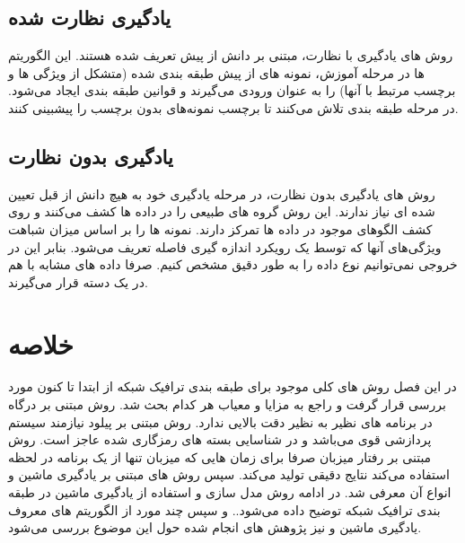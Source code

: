 \subsection{یادگیری نظارت شده}
روش های یادگیری با نظارت، مبتنی بر دانش از پیش تعریف شده هستند. این الگوریتم ها در مرحله آموزش، نمونه های از پیش طبقه بندی شده (متشکل از ویژگی ها و
برچسب مرتبط با آنها) را به عنوان ورودی می‌گیرند و قوانین طبقه بندی ایجاد می‌شود. در مرحله طبقه بندی تلاش می‌کنند تا برچسب نمونه‌های بدون برچسب را پیشبینی
کنند.

\subsection{یادگیری بدون نظارت}
روش های یادگیری بدون نظارت، در مرحله یادگیری خود به هیچ دانش از قبل تعیین شده ای نیاز ندارند. این روش گروه های طبیعی را در داده ها کشف می‌کنند و روی کشف الگوهای موجود در داده ها تمرکز دارند. نمونه ها را بر اساس میزان شباهت ویژگی‌های آنها که توسط یک رویکرد اندازه گیری فاصله تعریف می‌شود. بنابر این در خروجی نمی‌توانیم نوع داده را به طور دقیق مشخص کنیم. صرفا داده های مشابه با هم در یک دسته قرار می‌گیرند.
\section{خلاصه}
در این فصل روش های کلی موجود برای طبقه بندی ترافیک شبکه از ابتدا تا کنون مورد بررسی قرار گرفت و راجع به مزایا و معیاب هر کدام بحث شد. روش مبتنی بر درگاه در برنامه های نظیر به نظیر دقت بالایی ندارد. روش مبتنی بر پیلود نیازمند سیستم پردازشی قوی می‌باشد و در شناسایی بسته های رمزگاری شده عاجز است. روش مبتنی بر رفتار میزبان صرفا برای زمان هایی که میزبان تنها از یک برنامه در لحظه استفاده می‌کند نتایج دقیقی تولید می‌کند. سپس روش های مبتنی بر یادگیری ماشین و انواع آن معرفی شد.
در ادامه روش مدل سازی و استفاده از یادگیری ماشین در طبقه بندی ترافیک شبکه توضیح داده می‌شود.. و سپس چند مورد از الگوریتم های معروف یادگیری ماشین و نیز پژوهش های انجام شده حول این موضوع بررسی می‌شود.